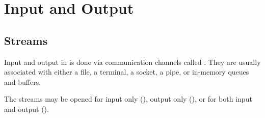 %
%
%
%
%
%
%

\chapter{Input and Output}
\label{chapio}
\section{Streams}
Input and output in {\eclipse} is done via communication channels
called .
They are usually associated with either a file, a terminal, a socket,
a pipe, or in-memory queues and buffers.

The streams may be opened for input only
(),
output only (),
or for both input and output ().

